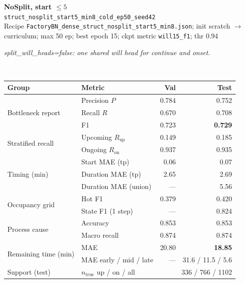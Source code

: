 \documentclass[9pt,a4paper,twocolumn]{extarticle}
\begin{document}
\noindent\begin{minipage}{\columnwidth}
\begin{center}
{\small\bfseries NoSplit, start $\le 5$}\\
{\scriptsize\texttt{struct\_nosplit\_start5\_min8\_cold\_ep50\_seed42}}\\
{\scriptsize Recipe \texttt{FactoryBN\_dense\_struct\_nosplit\_start5\_min8.json}; init scratch $\to$ curriculum; max 50 ep; best epoch 15; ckpt metric \texttt{will15\_f1}; thr 0.94}\\[1pt]
\parbox{0.96\columnwidth}{\scriptsize\itshape split\_will\_heads=false: one shared will head for continue and onset.}\\[2pt]
\scriptsize\setlength{\tabcolsep}{3pt}
\begin{tabular}{llrr}
\toprule
Group & Metric & Val & Test \\
\midrule
\multirow{3}{*}{Bottleneck report}
  & Precision $P$ & 0.784 & 0.752 \\
  & Recall $R$ & 0.670 & 0.708 \\
  & F1 & 0.723 & \textbf{0.729} \\
\midrule
\multirow{2}{*}{Stratified recall}
  & Upcoming $R_{\mathrm{up}}$ & 0.149 & 0.185 \\
  & Ongoing $R_{\mathrm{on}}$ & 0.937 & 0.935 \\
\midrule
\multirow{3}{*}{Timing (min)}
  & Start MAE (tp) & 0.06 & 0.07 \\
  & Duration MAE (tp) & 2.65 & 2.69 \\
  & Duration MAE (union) & --- & 5.56 \\
\midrule
\multirow{2}{*}{Occupancy grid}
  & Hot F1 & 0.379 & 0.420 \\
  & State F1 (1 step) & --- & 0.824 \\
\midrule
\multirow{2}{*}{Process cause}
  & Accuracy & 0.853 & 0.853 \\
  & Macro recall & 0.874 & 0.874 \\
\midrule
\multirow{2}{*}{Remaining time (min)}
  & MAE & 20.80 & \textbf{18.85} \\
  & MAE early / mid / late & --- & 31.6 / 11.5 / 5.6 \\
\midrule
Support (test)
  & $n_{\mathrm{true}}$ up / on / all & \multicolumn{2}{r}{336 / 766 / 1102} \\
\bottomrule
\end{tabular}
\end{center}
\end{minipage}\par\vspace{6pt}
\end{document}
